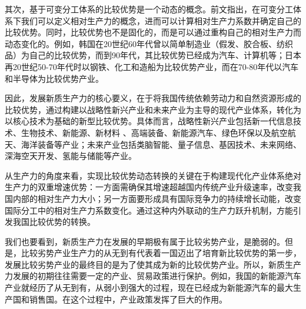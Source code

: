 其次，基于可变分工体系的比较优势是一个动态的概念。前文指出，在可变分工体系下我们可以定义相对生产力的概念，进而可以计算相对生产力系数并确定自己的比较优势。同时，比较优势也不是固化的，而是可以通过重构自己的相对生产力而动态变化的\cite[69-70]{LiuLeYiJingTaiBiJiaoYouShiDongTaiHuaDeQuDongLiYuLiShiJingYanJianLunFaZhanXinZhiShengChanLiYuTiShengChanYeLianGongYingLianRenXingNeiYin2025}。例如，韩国在20世纪60年代曾以简单制造业（假发、胶合板、纺织品）为自己的比较优势，而到90年代，其比较优势已经成为汽车、计算机等\cite[43]{westphalIndustrialPolicyExport1990}；日本再20世纪50-70年代时以钢铁、化工和造船为比较优势产业，而在70-80年代以汽车和半导体为比较优势产业\cite[278]{itoEastAsianMiracle1994}。

因此，发展新质生产力的核心要义，在于将我国传统依赖劳动力和自然资源形成的比较优势，通过构建以战略性新兴产业和未来产业为主导的现代产业体系\cite[29]{CaiJiMingXinZhiShengChanLiDeFaZhanDuiJieZhiChuangZaoHeJingJiZengChangDeGongXian2024}\cite{WuKeDaLiTuiJinXianDaiHuaChanYeTiXiJianSheJiaKuaiFaZhanXinZhiShengChanLi2024}\cite[18-20]{HuangQunHuiXinZhiShengChanLiXiTongYaoSuTeZhiJieGouChengZaiYuGongNengQuXiang2024}，转化为以核心技术为基础的新型比较优势\cite[6]{ZhouWenLunXinZhiShengChanLiNeiHanTeZhengYuChongYaoZhaoLiDian2023}。具体而言，战略性新兴产业包括新一代信息技术、生物技术、新能源、新材料 、高端装备、新能源汽车、绿色环保以及航空航天、海洋装备等产业；未来产业包括类脑智能、量子信息、基因技术、未来网络、深海空天开发、氢能与储能等产业\cite[24]{QuanGuoRenMinDaiBiaoDaHuiZhongHuaRenMinGongHeGuoGuoMinJingJiHeSheHuiFaZhanDiShiSiGeWuNianGuiHuaHe2035NianYuanJingMuBiaoGangYao2021}。

从生产力的角度来看，实现比较优势动态转换的关键在于构建现代化产业体系绝对生产力的双重增速优势：一方面需确保其增速超越国内传统产业升级速率，改变我国内部的相对生产力大小；另一方面要形成具有国际竞争力的持续增长动能，改变国际分工中的相对生产力系数变化。通过这种内外联动的生产力跃升机制，方能引发我国比较优势的转换。

我们也要看到，新质生产力在发展的早期极有属于比较劣势产业，是脆弱的。但是，比较劣势产业生产力的从无到有代表着一国迈出了培育新比较优势的第一步\cite[70]{LiuLeYiJingTaiBiJiaoYouShiDongTaiHuaDeQuDongLiYuLiShiJingYanJianLunFaZhanXinZhiShengChanLiYuTiShengChanYeLianGongYingLianRenXingNeiYin2025}，发展比较劣势产业的最终目的是为了使其成为新的比较优势产业。所以，新质生产力发展的初期往往需要一定的产业、贸易政策进行保护。例如，我国的新能源汽车产业就经历了从无到有，从弱小到强大的过程，现在已经成为新能源汽车的最大生产国和销售国。在这个过程中，产业政策发挥了巨大的作用。\cite{WangMingHeWoGuoXinNengYuanQiCheChanYeZhengCeYanJiu2023}

